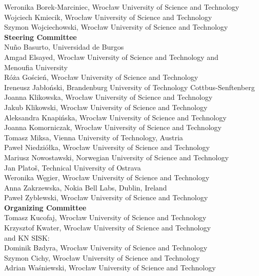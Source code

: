 \documentclass[
    letterpaper,
    10pt,%
    printed,%
    twoside,
    twosidepapers,
    papers=countpages,%
    paperselec=all, %
    hyperref={
        bookmarksdepth=1,
        bookmarksopen,
        bookmarksopenlevel=0,%
        linkcolor=blue,urlcolor=blue
    },%
    geometry={
        text={122truemm,126truemm},%
        inner=1.85in,top=35.00mm,
        bottom=50.00mm,footskip=10.00mm,
        voffset=-5mm
    },
]{confproc}
\begin{document}
\noindent Weronika Borek-Marciniec, Wrocław University of Science and Technology\\
Wojciech Kmiecik, Wrocław University of Science and Technology\\
Szymon Wojciechowski, Wrocław University of Science and Technology\\

\noindent \textbf{Steering Committee}\\

\noindent Nuño Basurto, Universidad de Burgos\\
Amgad Elsayed, Wrocław University of Science and Technology and\\Menoufia University\\
Róża Goścień, Wrocław University of Science and Technology\\
Ireneusz Jabłoński, Brandenburg University of Technology Cottbus-Senftenberg\\
Joanna Klikowska, Wrocław University of Science and Technology\\
Jakub Klikowski, Wrocław University of Science and Technology\\
Aleksandra Knapińska, Wrocław University of Science and Technology\\
Joanna Komorniczak, Wrocław University of Science and Technology\\
Tomasz Miksa, Vienna University of Technology, Austria\\
Paweł Niedziółka, Wrocław University of Science and Technology\\
Mariusz Nowostawski, Norwegian University of Science and Technology\\
Jan Platoš, Technical University of Ostrava\\
Weronika Węgier, Wrocław University of Science and Technology\\
Anna Zakrzewska, Nokia Bell Labs, Dublin, Ireland\\
Paweł Zyblewski, Wrocław University of Science and Technology\\

\noindent \textbf{Organizing Committee}\\

\noindent Tomasz Kucofaj, Wrocław University of Science and Technology\\
Krzysztof Kwater, Wrocław University of Science and Technology\\

\noindent and KN SISK:\\
Dominik Bzdyra, Wrocław University of Science and Technology\\
Szymon Cichy, Wrocław University of Science and Technology\\
Adrian Waśniewski, Wrocław University of Science and Technology\\
\end{document}
